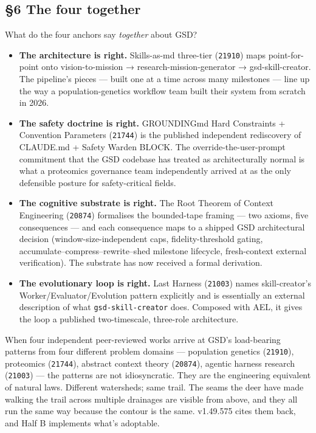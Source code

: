 \documentclass[11pt,letterpaper]{article}
\providecommand{\tightlist}{\setlength{\itemsep}{0pt}\setlength{\parskip}{0pt}}
\begin{document}
\subsection{§6 The four together}

What do the four anchors say \emph{together} about GSD?

\begin{itemize}
\tightlist
\item
  \textbf{The architecture is right.} Skills-as-md three-tier
  (\texttt{21910}) maps point-for-point onto vision-to-mission →
  research-mission-generator → gsd-skill-creator. The pipeline's pieces
  --- built one at a time across many milestones --- line up the way a
  population-genetics workflow team built their system from scratch in
  2026.
\item
  \textbf{The safety doctrine is right.} GROUNDINGmd Hard Constraints +
  Convention Parameters (\texttt{21744}) is the published independent
  rediscovery of CLAUDE.md + Safety Warden BLOCK. The
  override-the-user-prompt commitment that the GSD codebase has treated
  as architecturally normal is what a proteomics governance team
  independently arrived at as the only defensible posture for
  safety-critical fields.
\item
  \textbf{The cognitive substrate is right.} The Root Theorem of Context
  Engineering (\texttt{20874}) formalises the bounded-tape framing ---
  two axioms, five consequences --- and each consequence maps to a
  shipped GSD architectural decision (window-size-independent caps,
  fidelity-threshold gating, accumulate--compress--rewrite--shed
  milestone lifecycle, fresh-context external verification). The
  substrate has now received a formal derivation.
\item
  \textbf{The evolutionary loop is right.} Last Harness (\texttt{21003})
  names skill-creator's Worker/Evaluator/Evolution pattern explicitly
  and is essentially an external description of what
  \texttt{gsd-skill-creator} does. Composed with AEL, it gives the loop
  a published two-timescale, three-role architecture.
\end{itemize}

When four independent peer-reviewed works arrive at GSD's load-bearing
patterns from four different problem domains --- population genetics
(\texttt{21910}), proteomics (\texttt{21744}), abstract context theory
(\texttt{20874}), agentic harness research (\texttt{21003}) --- the
patterns are not idiosyncratic. They are the engineering equivalent of
natural laws. Different watersheds; same trail. The seams the deer have
made walking the trail across multiple drainages are visible from above,
and they all run the same way because the contour is the same. v1.49.575
cites them back, and Half B implements what's adoptable.
\end{document}
